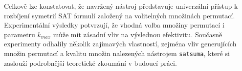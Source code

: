 Celkově lze konstatovat, že navržený nástroj představuje univerzální přístup k rozbíjení symetrií SAT formulí založený na volitelných množinách permutací. Experimentální výsledky potvrzují, že vhodná volba množiny permutací i parametru $k_{max}$ může mít zásadní vliv na výslednou efektivitu. Současně experimenty odhalily několik zajímavých vlastností, zejména vliv generujících množin permutací a kvalitu množin nalezených nástrojem \texttt{satsuma}, které si zaslouží podrobnější teoretické zkoumání v budoucí práci.